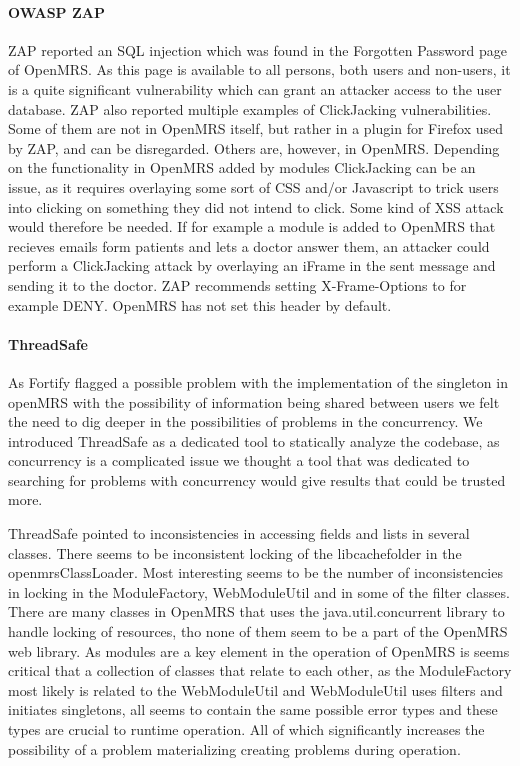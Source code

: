 \documentclass{report} %
\begin{document}
\paragraph{OWASP ZAP}
ZAP reported an SQL injection which was found in the Forgotten Password page of
OpenMRS. As this page is available to all persons, both users and non-users, it
is a quite significant vulnerability which can grant an attacker access to the
user database. ZAP also reported multiple examples of ClickJacking
vulnerabilities. Some of them are not in OpenMRS itself, but rather in a plugin
for Firefox used by ZAP, and can be disregarded. Others are, however, in
OpenMRS. Depending on the functionality in OpenMRS added by modules ClickJacking
can be an issue, as it requires overlaying some sort of CSS and/or Javascript to
trick users into clicking on something they did not intend to click. Some kind
of XSS attack would therefore be needed. If for example a module is added to
OpenMRS that recieves emails form patients and lets a doctor answer them, an attacker
could perform a ClickJacking attack by overlaying an iFrame in the sent message
and sending it to the doctor. ZAP recommends setting X-Frame-Options to for
example DENY. OpenMRS has not set this header by default.

\paragraph{ThreadSafe}
As Fortify flagged a possible problem with the implementation of the singleton
in openMRS with the possibility of information being shared between users we
felt the need to dig deeper in the possibilities of problems in the concurrency.
We introduced ThreadSafe as a dedicated tool to statically analyze
the codebase, as concurrency is a complicated issue we thought a tool that
was dedicated to searching for problems with concurrency would give results that
could be trusted more.

ThreadSafe pointed to inconsistencies in accessing fields and lists in several
classes. There seems to be inconsistent locking of the libcachefolder in the
openmrsClassLoader. Most interesting seems to be the number of inconsistencies
in locking in the ModuleFactory, WebModuleUtil and in some of the filter
classes. There are many classes in OpenMRS that uses the java.util.concurrent library to
handle locking of resources, tho none of them seem to be a part of the OpenMRS
web library. As modules are a key element in the operation of OpenMRS is seems
critical that a collection of classes that relate to each other, as the
ModuleFactory most likely is related to the WebModuleUtil and WebModuleUtil uses
filters and initiates singletons, all seems to contain the same possible error
types and these types are crucial to runtime operation. All of which
significantly increases the possibility of a problem materializing creating
problems during operation. 
\end{document}

